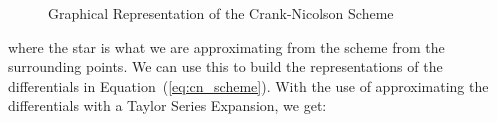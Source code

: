 \documentclass[addpoints]{exam}
\begin{document}
\begin{questions}
\begin{parts}
\begin{solution}
\begin{figure}[H]
\caption{Graphical Representation of the Crank-Nicolson Scheme}
\end{figure}

where the star is what we are approximating from the scheme from the surrounding points. We can use this to build the representations of the differentials in Equation~(\ref{eq:cn_scheme}). With the use of approximating the differentials with a Taylor Series Expansion, we get:


\end{solution}
\end{parts}
\end{questions}
\end{document}
